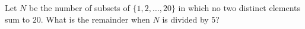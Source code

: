 Let $N$ be the number of subsets of $\{1,2,\dots,20\}$ in which no two distinct elements sum to $20$. What is the remainder when $N$ is divided by $5$?

